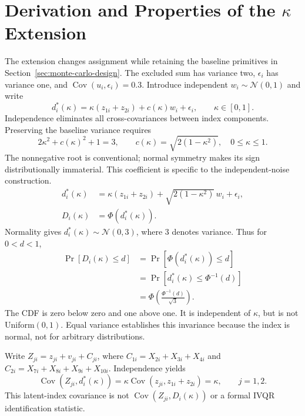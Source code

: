 \clearpage
\section{Derivation and Properties of the \texorpdfstring{$\kappa$}{kappa} Extension}
\label{app:kappa-derivation}
\setcounter{equation}{0}\setcounter{table}{0}\setcounter{figure}{0}
The extension changes assignment while retaining the baseline primitives in Section~\ref{sec:monte-carlo-design}. The excluded sum has variance two, $\epsilon_i$ has variance one, and $\operatorname{Cov}(u_i,\epsilon_i)=0.3$. Introduce independent $w_i\sim\mathcal N(0,1)$ and write
\begin{equation}
 d_i^*(\kappa)=\kappa(z_{1i}+z_{2i})+c(\kappa)w_i+\epsilon_i,
 \qquad \kappa\in[0,1].
 \label{eq:appendix-kappa-unknown}
\end{equation}
Independence eliminates all cross-covariances between index components. Preserving the baseline variance requires
\[
2\kappa^2+c(\kappa)^2+1=3,
\qquad c(\kappa)=\sqrt{2(1-\kappa^2)},\quad 0\le\kappa\le1.
\]
The nonnegative root is conventional; normal symmetry makes its sign distributionally immaterial. This coefficient is specific to the independent-noise construction.
\begin{equation}
 \begin{aligned}
 d_i^*(\kappa)&=\kappa(z_{1i}+z_{2i})+\sqrt{2(1-\kappa^2)}\,w_i+\epsilon_i,\\
 D_i(\kappa)&=\Phi\!\left(d_i^*(\kappa)\right).
 \end{aligned}
 \label{eq:appendix-kappa-assignment}
\end{equation}
Normality gives $d_i^*(\kappa)\sim\mathcal N(0,3)$, where 3 denotes variance. Thus for $0<d<1$,
\begin{equation}
 \begin{aligned}
 \Pr\!\left[D_i(\kappa)\le d\right]
 &=\Pr\!\left[\Phi(d_i^*(\kappa))\le d\right]\\
 &=\Pr\!\left[d_i^*(\kappa)\le\Phi^{-1}(d)\right]\\
 &=\Phi\!\left(\frac{\Phi^{-1}(d)}{\sqrt{3}}\right).
 \end{aligned}
 \label{eq:appendix-treatment-cdf}
\end{equation}
The CDF is zero below zero and one above one. It is independent of $\kappa$, but is not Uniform$(0,1)$. Equal variance establishes this invariance because the index is normal, not for arbitrary distributions.

Write $Z_{ji}=z_{ji}+v_{ji}+C_{ji}$, where $C_{1i}=X_{2i}+X_{3i}+X_{4i}$ and $C_{2i}=X_{7i}+X_{8i}+X_{9i}+X_{10i}$. Independence yields
\[
\operatorname{Cov}(Z_{ji},d_i^*(\kappa))
=\kappa\operatorname{Cov}(z_{ji},z_{1i}+z_{2i})=\kappa,
\qquad j=1,2.
\]
This latent-index covariance is not $\operatorname{Cov}(Z_{ji},D_i(\kappa))$ or a formal IVQR identification statistic.

